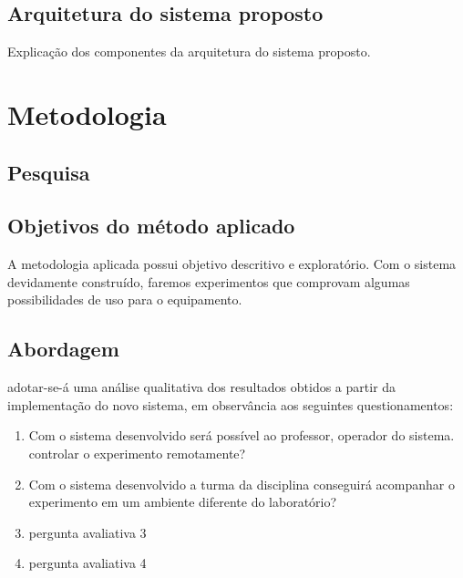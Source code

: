 \documentclass[12pt,a4paper,oneside]{book}
\begin{document}
\section{Arquitetura do sistema proposto}

Explicação dos componentes da arquitetura do sistema proposto.
%



\chapter{Metodologia}
\label{chapter:Metodologia}
%
\thispagestyle{empty} 
%
\section{Pesquisa}


%
\section{Objetivos do método aplicado}
A metodologia aplicada possui objetivo descritivo e exploratório. Com o sistema devidamente construído, faremos experimentos que comprovam algumas possibilidades de uso para o equipamento.

\section{Abordagem}
adotar-se-á uma análise qualitativa dos resultados obtidos a partir da implementação do novo sistema, em observância aos seguintes questionamentos:
\begin{enumerate}
    \item Com o sistema desenvolvido será possível ao professor, operador do sistema. controlar o experimento remotamente?
    \item Com o sistema desenvolvido a turma da disciplina conseguirá acompanhar o experimento em um ambiente diferente do laboratório?
    \item pergunta avaliativa 3
    \item pergunta avaliativa 4
\end{enumerate}
%
%
\end{document}
